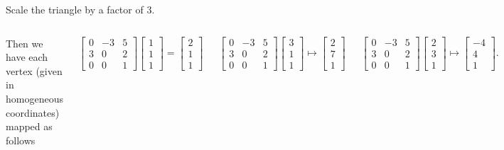 \documentclass[xcolor=dvipsnames,aspectratio=169,t]{beamer}
\begin{document}
\begin{frame}
\bb
\ii \alert{Scale the triangle by a factor of 3.}
\ii {}
\ii {}
\ee

\begin{columns}[T]

\column{0.5\tw}
Then we have each vertex (given in homogeneous coordinates) mapped as follows

$$\begin{bmatrix} 0 & -3 & 5\\
3 & 0 & 2 \\ 0 & 0 & 1 \end{bmatrix} \begin{bmatrix} 1 \\ 1 \\ 1 \end{bmatrix} = \begin{bmatrix} 2 \\ 1 \\ 1 \end{bmatrix}$$

$$\begin{bmatrix} 0 & -3 & 5\\
3 & 0 & 2 \\ 0 & 0 & 1 \end{bmatrix} \begin{bmatrix} 3 \\ 1 \\ 1 \end{bmatrix} \mapsto \begin{bmatrix} 2 \\ 7 \\ 1 \end{bmatrix}$$

$$\begin{bmatrix} 0 & -3 & 5\\
3 & 0 & 2 \\ 0 & 0 & 1 \end{bmatrix} \begin{bmatrix} 2 \\ 3 \\ 1 \end{bmatrix} \mapsto \begin{bmatrix} -4 \\ 4 \\ 1 \end{bmatrix}.$$

\column{0.5\tw}


\end{columns}
\end{frame}
\end{document}
